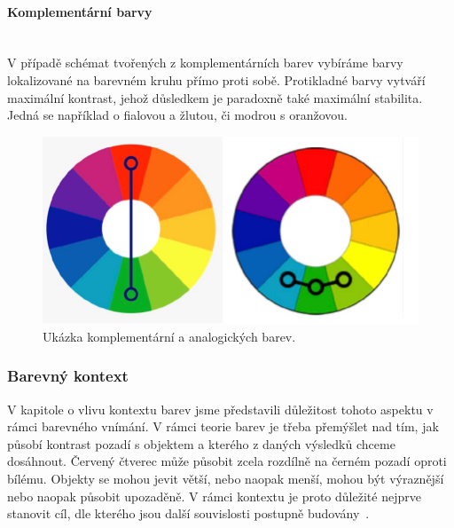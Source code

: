 \paragraph{Komplementární barvy}\mbox{}\\
V případě schémat tvořených z komplementárních barev vybíráme barvy lokalizované na barevném kruhu přímo proti sobě. Protikladné barvy vytváří maximální kontrast,
jehož důsledkem je paradoxně také maximální stabilita. Jedná se například o fialovou a žlutou, či modrou s oranžovou.

\begin{figure}[!ht]
    \centering
    \includegraphics[width=0.6\linewidth]{images/complementary-analogous.png}
    \caption{Ukázka komplementární a analogických barev.~\cite{article}}
    \label{fig:Barevný kruh}
\end{figure}

\subsubsection{Barevný kontext}
V kapitole o vlivu kontextu barev jsme představili důležitost tohoto aspektu v rámci barevného vnímání. V rámci
teorie barev je třeba přemýšlet nad tím, jak působí kontrast pozadí s objektem a kterého z daných výsledků chceme dosáhnout.
Červený čtverec může působit zcela rozdílně na černém pozadí oproti bílému. Objekty se mohou jevit větší, nebo naopak menší, mohou
být výraznější nebo naopak působit upozaděně. V rámci kontextu je proto důležité nejprve stanovit cíl, dle kterého jsou další souvislosti postupně budovány~\cite{colormatters_basic_color_theory}.


